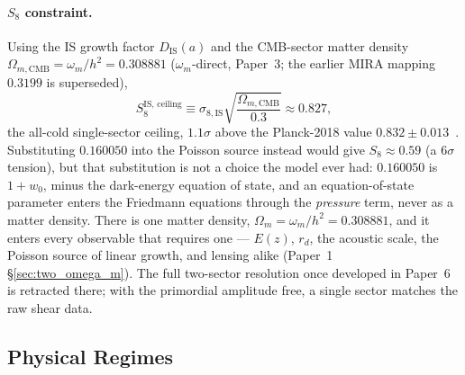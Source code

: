 \paragraph{$S_{8}$ constraint.}
Using the IS growth factor $D_{\mathrm{IS}}(a)$ and the CMB-sector matter
density $\Omega_{m,\mathrm{CMB}} = \omega_m/h^2 = 0.308881$
($\omega_m$-direct, Paper~3; the earlier MIRA mapping $0.3199$ is superseded),
%
\begin{equation}
  S_{8}^{\mathrm{IS,\,ceiling}}
    \equiv \sigma_{8,\mathrm{IS}}
           \sqrt{\frac{\Omega_{m,\mathrm{CMB}}}{0.3}}
    \approx 0.827,
  \label{eq:S8_IS}
\end{equation}
%
the all-cold single-sector ceiling, $1.1\sigma$ above the Planck-2018 value $0.832 \pm 0.013$~\citep{PlanckVI2020}.
Substituting $0.160050$ into the Poisson source instead would give
$S_{8}\approx0.59$ (a $6\sigma$ tension), but that substitution is not a
choice the model ever had: $0.160050$ is $1+w_0$, minus the dark-energy
equation of state, and an equation-of-state parameter enters the Friedmann
equations through the \emph{pressure} term, never as a matter density. There
is one matter density, $\Omega_m=\omega_m/h^2=0.308881$, and it enters every
observable that requires one --- $E(z)$, $r_d$, the acoustic scale, the
Poisson source of linear growth, and lensing alike (Paper~1
\S\ref{sec:two_omega_m}). The full
two-sector resolution once developed in Paper~6 is retracted there; with the
primordial amplitude free, a single sector matches the raw shear data.%

\subsection{Physical Regimes}
\label{sec:eft:regimes}

